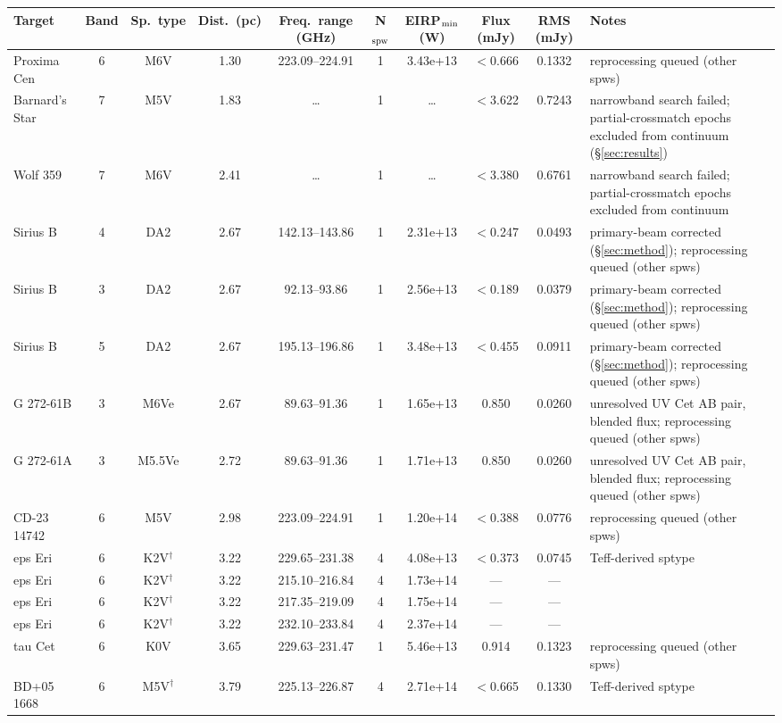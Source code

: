 \documentclass{openjournal}
\begin{document}
\begin{table}
\begin{tabularx}{\textwidth}{@{}l c c c c c c c c X@{}}
\hline
Target & Band & Sp.\ type & Dist.\ (pc) & Freq.\ range (GHz) & N$_{\rm spw}$ & EIRP$_{\rm min}$ (W) & Flux (mJy) & RMS (mJy) & Notes \\
\hline
Proxima Cen & 6 & M6V & 1.30 & 223.09--224.91 & 1 & 3.43e+13 & $<$0.666 & 0.1332 & reprocessing queued (other spws) \\
Barnard's Star & 7 & M5V & 1.83 & \ldots & 1 & \ldots & $<$3.622 & 0.7243 & narrowband search failed; partial-crossmatch epochs excluded from continuum (\S\ref{sec:results}) \\
Wolf  359 & 7 & M6V & 2.41 & \ldots & 1 & \ldots & $<$3.380 & 0.6761 & narrowband search failed; partial-crossmatch epochs excluded from continuum \\
Sirius B & 4 & DA2 & 2.67 & 142.13--143.86 & 1 & 2.31e+13 & $<$0.247 & 0.0493 & primary-beam corrected (\S\ref{sec:method}); reprocessing queued (other spws) \\
Sirius B & 3 & DA2 & 2.67 & 92.13--93.86 & 1 & 2.56e+13 & $<$0.189 & 0.0379 & primary-beam corrected (\S\ref{sec:method}); reprocessing queued (other spws) \\
Sirius B & 5 & DA2 & 2.67 & 195.13--196.86 & 1 & 3.48e+13 & $<$0.455 & 0.0911 & primary-beam corrected (\S\ref{sec:method}); reprocessing queued (other spws) \\
G 272-61B & 3 & M6Ve & 2.67 & 89.63--91.36 & 1 & 1.65e+13 & 0.850 & 0.0260 & unresolved UV Cet AB pair, blended flux; reprocessing queued (other spws) \\
G 272-61A & 3 & M5.5Ve & 2.72 & 89.63--91.36 & 1 & 1.71e+13 & 0.850 & 0.0260 & unresolved UV Cet AB pair, blended flux; reprocessing queued (other spws) \\
CD-23 14742 & 6 & M5V & 2.98 & 223.09--224.91 & 1 & 1.20e+14 & $<$0.388 & 0.0776 & reprocessing queued (other spws) \\
eps Eri & 6 & K2V$^\dagger$ & 3.22 & 229.65--231.38 & 4 & 4.08e+13 & $<$0.373 & 0.0745 & Teff-derived sptype \\
eps Eri & 6 & K2V$^\dagger$ & 3.22 & 215.10--216.84 & 4 & 1.73e+14 & --- & --- &  \\
eps Eri & 6 & K2V$^\dagger$ & 3.22 & 217.35--219.09 & 4 & 1.75e+14 & --- & --- &  \\
eps Eri & 6 & K2V$^\dagger$ & 3.22 & 232.10--233.84 & 4 & 2.37e+14 & --- & --- &  \\
tau Cet & 6 & K0V & 3.65 & 229.63--231.47 & 1 & 5.46e+13 & 0.914 & 0.1323 & reprocessing queued (other spws) \\
BD+05  1668 & 6 & M5V$^\dagger$ & 3.79 & 225.13--226.87 & 4 & 2.71e+14 & $<$0.665 & 0.1330 & Teff-derived sptype \\

\end{tabularx}
\end{table}
\end{document}

